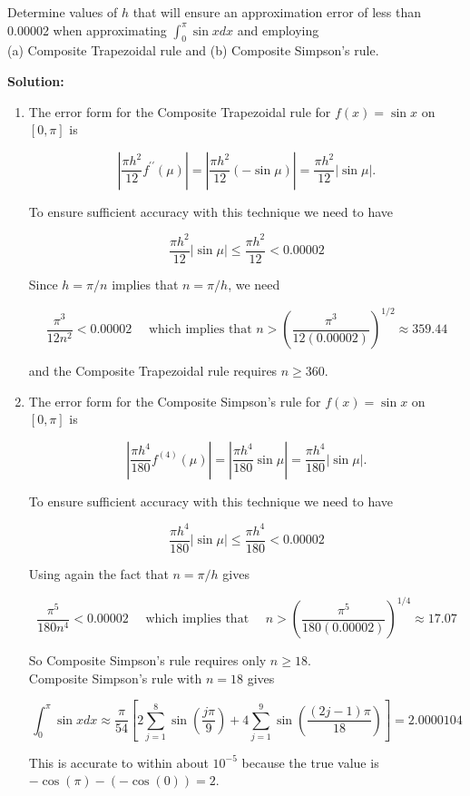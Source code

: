 \documentclass[12pt,a4paper]{article}
\begin{document}
\begin{example}
Determine values of $h$ that will ensure an approximation error of less than 0.00002 when approximating $\int_{0}^{\pi} \sin x d x$ and employing\\
(a) Composite Trapezoidal rule and (b) Composite Simpson's rule.


\textbf{Solution:}
\begin{enumerate}[label=(\alph*)]
\item The error form for the Composite Trapezoidal rule for $f(x)=\sin x$ on $[0, \pi]$ is

$$
\left|\frac{\pi h^{2}}{12} f^{\prime \prime}(\mu)\right|=\left|\frac{\pi h^{2}}{12}(-\sin \mu)\right|=\frac{\pi h^{2}}{12}|\sin \mu| .
$$

To ensure sufficient accuracy with this technique we need to have

$$
\frac{\pi h^{2}}{12}|\sin \mu| \leq \frac{\pi h^{2}}{12}<0.00002
$$

Since $h=\pi / n$ implies that $n=\pi / h$, we need

$$
\frac{\pi^{3}}{12 n^{2}}<0.00002 \quad \text { which implies that } n>\left(\frac{\pi^{3}}{12(0.00002)}\right)^{1 / 2} \approx 359.44
$$

and the Composite Trapezoidal rule requires $n \geq 360$.
\item The error form for the Composite Simpson's rule for $f(x)=\sin x$ on $[0, \pi]$ is

$$
\left|\frac{\pi h^{4}}{180} f^{(4)}(\mu)\right|=\left|\frac{\pi h^{4}}{180} \sin \mu\right|=\frac{\pi h^{4}}{180}|\sin \mu| .
$$

To ensure sufficient accuracy with this technique we need to have

$$
\frac{\pi h^{4}}{180}|\sin \mu| \leq \frac{\pi h^{4}}{180}<0.00002
$$

Using again the fact that $n=\pi / h$ gives

$$
\frac{\pi^{5}}{180 n^{4}}<0.00002 \quad \text { which implies that } \quad n>\left(\frac{\pi^{5}}{180(0.00002)}\right)^{1 / 4} \approx 17.07
$$

So Composite Simpson's rule requires only $n \geq 18$.\\
Composite Simpson's rule with $n=18$ gives

$$
\int_{0}^{\pi} \sin x d x \approx \frac{\pi}{54}\left[2 \sum_{j=1}^{8} \sin \left(\frac{j \pi}{9}\right)+4 \sum_{j=1}^{9} \sin \left(\frac{(2 j-1) \pi}{18}\right)\right]=2.0000104
$$

This is accurate to within about $10^{-5}$ because the true value is $-\cos (\pi)-(-\cos (0))=2$.
\end{enumerate}
\end{example}
\end{document}
